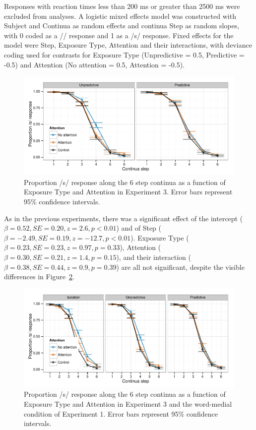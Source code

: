 Responses with reaction times less than 200 ms or greater than 2500 ms were excluded from analyses. 
A logistic mixed effects model was constructed with Subject and Continua as random effects and continua Step as random slopes, with 0 coded as a /\textesh/ response and 1 as a /s/ response.  Fixed effects for the model were Step, Exposure Type, Attention and their interactions, with deviance coding used for contrasts for Exposure Type (Unpredictive = 0.5, Predictive = -0.5) and Attention (No attention = 0.5, Attention = -0.5).


\begin{figure}[!ht]
\caption{Proportion /s/ response along the 6 step continua as a function of Exposure Type and Attention in Experiment 3.  Error bars represent 95\% confidence intervals.}
\label{fig:exp3categ}
\begin{center}
\includegraphics[width=\textwidth]{graphs/exp3_categresults}
\end{center}
\end{figure}

As in the previous experiments, there was a significant effect of the intercept ($\beta = 0.52, SE = 0.20, z = 2.6, p < 0.01$) and of Step ($\beta = -2.49, SE = 0.19, z = -12.7, p < 0.01$).
Exposure Type ($\beta = 0.23, SE = 0.23, z = 0.97, p = 0.33$), Attention ($\beta = 0.30, SE = 0.21, z = 1.4, p = 0.15$), and their interaction ($\beta = 0.38, SE = 0.44, z = 0.9, p = 0.39$) are all not significant, despite the visible differences in Figure~\ref{fig:exp23categ}.


\begin{figure}[!ht]
\caption{Proportion /s/ response along the 6 step continua as a function of Exposure Type and Attention in Experiment 3 and the word-medial condition of Experiment 1.  Error bars represent 95\% confidence intervals.}
\label{fig:exp23categ}
\begin{center}
\includegraphics[width=\textwidth]{graphs/exp23_categresults}
\end{center}
\end{figure}


